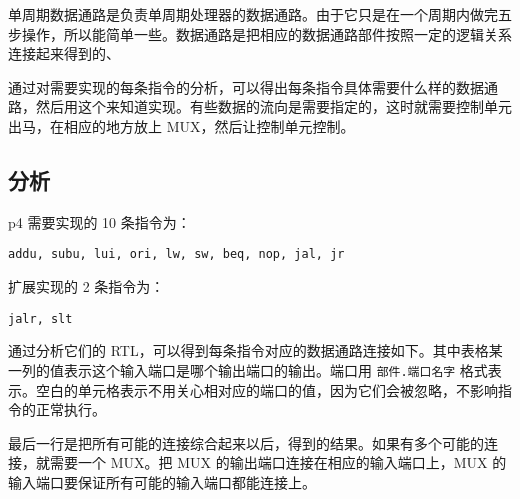 \documentclass[12pt,AutoFakeBold,AutoFakeSlant]{article}
\begin{document}
单周期数据通路是负责单周期处理器的数据通路。由于它只是在一个周期内做完五步操作，所以能简单一些。数据通路是把相应的数据通路部件按照一定的逻辑关系连接起来得到的、

通过对需要实现的每条指令的分析，可以得出每条指令具体需要什么样的数据通路，然后用这个来知道实现。有些数据的流向是需要指定的，这时就需要控制单元出马，在相应的地方放上
MUX，然后让控制单元控制。

\hypertarget{ux5206ux6790}{%
\subsection{分析}\label{ux5206ux6790}}

p4 需要实现的 10 条指令为：

\texttt{addu,\ subu,\ lui,\ ori,\ lw,\ sw,\ beq,\ nop,\ jal,\ jr}

扩展实现的 2 条指令为：

\texttt{jalr,\ slt}

通过分析它们的
RTL，可以得到每条指令对应的数据通路连接如下。其中表格某一列的值表示这个输入端口是哪个输出端口的输出。端口用
\texttt{部件.端口名字}
格式表示。空白的单元格表示不用关心相对应的端口的值，因为它们会被忽略，不影响指令的正常执行。

最后一行是把所有可能的连接综合起来以后，得到的结果。如果有多个可能的连接，就需要一个
MUX。把 MUX 的输出端口连接在相应的输入端口上，MUX
的输入端口要保证所有可能的输入端口都能连接上。
\end{document}
